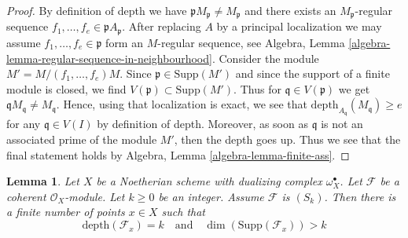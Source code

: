 \documentclass{stacks-project}
\theoremstyle{plain}
\newtheorem{lemma}[subsection]{Lemma}
\theoremstyle{definition}
\theoremstyle{remark}
\numberwithin{equation}{subsection}
\begin{document}
\begin{proof}
By definition of depth we have $\mathfrak p M_\mathfrak p \not = M_\mathfrak p$
and there exists an $M_\mathfrak p$-regular sequence
$f_1, \ldots, f_e \in \mathfrak p A_\mathfrak p$. After replacing $A$ by
a principal localization we may assume $f_1, \ldots, f_e \in \mathfrak p$
form an $M$-regular sequence, see
Algebra, Lemma \ref{algebra-lemma-regular-sequence-in-neighbourhood}.
Consider the module $M' = M/(f_1, \ldots, f_e)M$.
Since $\mathfrak p \in \text{Supp}(M')$
and since the support of a finite module is closed, we find
$V(\mathfrak p) \subset \text{Supp}(M')$. Thus
for $\mathfrak q \in V(\mathfrak p)$ we get
$\mathfrak q M_\mathfrak q \not = M_\mathfrak q$. Hence, using that
localization is exact, we see that
$\text{depth}_{A_\mathfrak q}(M_\mathfrak q) \geq e$
for any $\mathfrak q \in V(I)$ by definition of depth.
Moreover, as soon as $\mathfrak q$ is not an associated
prime of the module $M'$, then the depth goes up.
Thus we see that the final statement holds by
Algebra, Lemma \ref{algebra-lemma-finite-ass}.
\end{proof}

\begin{lemma}
\label{lemma-finite-nr-points-next-S}
Let $X$ be a Noetherian scheme with dualizing complex $\omega_X^\bullet$.
Let $\mathcal{F}$ be a coherent $\mathcal{O}_X$-module. Let $k \geq 0$
be an integer. Assume $\mathcal{F}$ is $(S_k)$.
Then there is a finite number of points $x \in X$ such that
$$
\text{depth}(\mathcal{F}_x) = k
\quad\text{and}\quad
\dim(\text{Supp}(\mathcal{F}_x)) > k
$$
\end{lemma}
\end{document}
